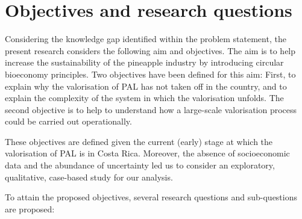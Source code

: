 \section{Objectives and research questions}
\label{researchQ}

Considering the knowledge gap identified within the problem statement, the present research considers the following aim and objectives. The aim is to help increase the sustainability of the pineapple industry by introducing circular bioeconomy principles. Two objectives have been defined for this aim: First, to explain why the valorisation of PAL has not taken off in the country, and to explain the complexity of the system in which the valorisation unfolds. The second objective is to help to understand how a large-scale valorisation process could be carried out operationally. 

These objectives are defined given the current (early) stage at which the valorisation of PAL is in Costa Rica. Moreover, the absence of socioeconomic data and the abundance of uncertainty led us to consider an exploratory, qualitative, case-based study for our analysis.

To attain the proposed objectives, several research questions and sub-questions are proposed:

